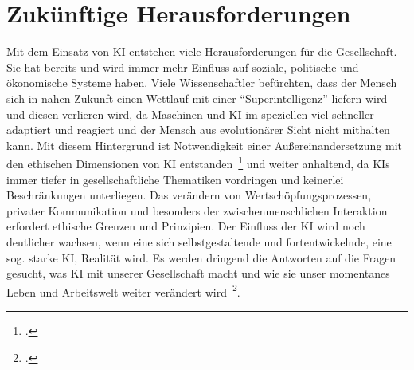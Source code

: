 \newpage
\section{Zukünftige Herausforderungen}\label{Herausforderungen}

Mit dem Einsatz von \ac{KI} entstehen viele Herausforderungen für die Gesellschaft. Sie hat bereits und wird immer mehr Einfluss auf soziale, politische und ökonomische Systeme haben.
Viele Wissenschaftler befürchten, dass der Mensch sich in nahen Zukunft einen Wettlauf mit einer \enquote{Superintelligenz} liefern wird und diesen verlieren wird,
da Maschinen und \ac{KI} im speziellen viel schneller adaptiert und reagiert und der Mensch aus evolutionärer Sicht nicht mithalten kann. Mit diesem Hintergrund ist 
Notwendigkeit einer Außereinandersetzung mit den ethischen Dimensionen von \ac{KI} entstanden~\footcite[\vglf][]{Wittpahl.2018} und weiter anhaltend, da \ac{KI}s
immer tiefer in gesellschaftliche Thematiken vordringen und keinerlei Beschränkungen unterliegen. Das verändern von Wertschöpfungsprozessen, privater Kommunikation und 
besonders der zwischenmenschlichen Interaktion erfordert ethische Grenzen und Prinzipien. Der Einfluss der \ac{KI} wird noch deutlicher wachsen, 
wenn eine sich selbstgestaltende und fortentwickelnde, eine sog. starke \ac{KI}, Realität wird. Es werden dringend die Antworten auf die Fragen gesucht, was \ac{KI} mit
unserer Gesellschaft macht und wie sie unser momentanes Leben und Arbeitswelt weiter verändert wird~\footcite[\vglf][]{Wittpahl.2018}.

